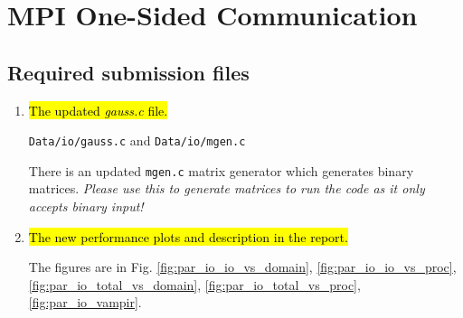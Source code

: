 \section{MPI One-Sided Communication}
\subsection{Required submission files}
\begin{enumerate}
  \item \hl{The updated \emph{gauss.c} file.}
  
  \verb!Data/io/gauss.c! and \verb!Data/io/mgen.c!
  
  There is an updated \verb!mgen.c! matrix generator which generates binary matrices.
  \emph{Please use this to generate matrices to run the code as it only accepts binary input!}

  \item \hl{The new performance plots and description in the report.}
  
  The figures are in Fig. \ref{fig:par_io_io_vs_domain}, \ref{fig:par_io_io_vs_proc},
  \ref{fig:par_io_total_vs_domain}, \ref{fig:par_io_total_vs_proc}, \ref{fig:par_io_vampir}.

\end{enumerate}

